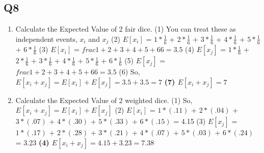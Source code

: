 \documentclass{article}
\begin{document}
\subsection*{Q8}
\begin{enumerate}[label=(\alph*)]
    \item Calculate the Expected Value of 2 fair dice.
    \subitem (1) You can treat these as independent events, $x_{i}$ and $x_{j}$
    \subitem (2) $E[x_{i}]$ = $1*\frac{1}{6}$ + $2*\frac{1}{6}$ + $3*\frac{1}{6}$ + $4*\frac{1}{6}$ + $5*\frac{1}{6}$ + $6*\frac{1}{6}$ 
    \subitem (3) $E[x_{i}]$ = $frac{1+2+3+4+5+6}{6} = 3.5$
    \subitem (4) $E[x_{j}]$ = $1*\frac{1}{6}$ + $2*\frac{1}{6}$ + $3*\frac{1}{6}$ + $4*\frac{1}{6}$ + $5*\frac{1}{6}$ + $6*\frac{1}{6}$ 
    \subitem (5) $E[x_{j}]$ = $frac{1+2+3+4+5+6}{6} = 3.5$
    \subitem (6) So, $E[x_{i} + x_{j}] = E[x_{i}] + E[x_{j}] = 3.5 + 3.5 = 7$
    \subitem \textbf{(7) $E[x_{i} + x_{j}] = 7$}

    \item Calculate the Expected Value of 2 weighted dice.
    \subitem (1) So, $E[x_{i} + x_{j}] = E[x_{i}] + E[x_{j}]$
    \subitem (2) $E[x_{i}]$ = $1*(.11)$ + $2*(.04)$ + $3*(.07)$ + $4*(.30)$ + $5*(.33)$ + $6*(.15)$ = 4.15
    \subitem (3) $E[x_{j}]$ = $1*(.17)$ + $2*(.28)$ + $3*(.21)$ + $4*(.07)$ + $5*(.03)$ + $6*(.24)$ = 3.23
    \subitem \textbf{(4) $E[x_{i} + x_{j}] = 4.15 + 3.23 = 7.38$}

\end{enumerate}

\end{document}
